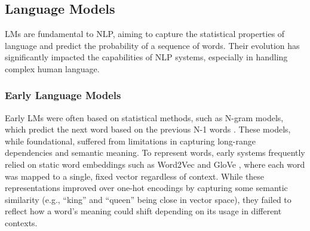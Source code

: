 \chapter{}
\label{ch:background}



\section{Language Models}
\label{ch:background:language_models}
\acp{LM} are fundamental to \ac{NLP}, aiming to capture the statistical properties of language and predict the probability of a sequence of words. Their evolution has significantly impacted the capabilities of NLP systems, especially in handling complex human language.

\subsection{Early Language Models}
Early \acp{LM} were often based on statistical methods, such as N-gram models, which predict the next word based on the previous N-1 words \cite{buck2014n}. These models, while foundational, suffered from limitations in capturing long-range dependencies and semantic meaning. To represent words, early systems frequently relied on static word embeddings such as Word2Vec \cite{mikolov2013efficient} and GloVe \cite{GLOVE}, where each word was mapped to a single, fixed vector regardless of context. While these representations improved over one-hot encodings by capturing some semantic similarity (e.g., ``king” and ``queen” being close in vector space), they failed to reflect how a word's meaning could shift depending on its usage in different contexts.

